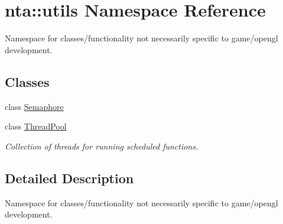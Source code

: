 \hypertarget{namespacenta_1_1utils}{}\section{nta\+:\+:utils Namespace Reference}
\label{namespacenta_1_1utils}


Namespace for classes/functionality not necessarily specific to game/opengl development.  


\subsection*{Classes}
\begin{DoxyCompactItemize}
\item 
class \hyperlink{classnta_1_1utils_1_1Semaphore}{Semaphore}
\item 
class \hyperlink{classnta_1_1utils_1_1ThreadPool}{Thread\+Pool}
\begin{DoxyCompactList}\small\item\em Collection of threads for running scheduled functions. \end{DoxyCompactList}\end{DoxyCompactItemize}


\subsection{Detailed Description}
Namespace for classes/functionality not necessarily specific to game/opengl development. 